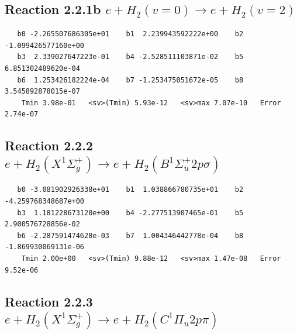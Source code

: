 \documentclass[12pt,dvipdfmx]{article}
\begin{document}
\newpage
\subsection{
Reaction 2.2.1b $  e + H_2(v=0) \rightarrow e + H_2(v=2)$}


\begin{small}\begin{verbatim}
   b0 -2.265507686305e+01    b1  2.239943592222e+00    b2 -1.099426577160e+00
   b3  2.339027647223e-01    b4 -2.528511103871e-02    b5  6.851302489620e-04
   b6  1.253426182224e-04    b7 -1.253475051672e-05    b8  3.545892878015e-07
    Tmin 3.98e-01   <sv>(Tmin) 5.93e-12   <sv>max 7.07e-10   Error 2.74e-07
\end{verbatim}\end{small}

\newpage
\subsection{
Reaction 2.2.2 $e + H_2(X^1\Sigma_g^+) \rightarrow e + H_2(B^1\Sigma_u^+2p\sigma)$}














\begin{small}\begin{verbatim}
   b0 -3.081902926338e+01    b1  1.038866780735e+01    b2 -4.259768348687e+00
   b3  1.181228673120e+00    b4 -2.277513907465e-01    b5  2.900576728856e-02
   b6 -2.287591474628e-03    b7  1.004346442778e-04    b8 -1.869930069131e-06
    Tmin 2.00e+00   <sv>(Tmin) 9.88e-12   <sv>max 1.47e-08   Error 9.52e-06
\end{verbatim}\end{small}

\newpage
\subsection{
Reaction 2.2.3 $e + H_2(X^1\Sigma_g^+) \rightarrow e + H_2(C^1\Pi_u2p\pi) $}






\end{document}
